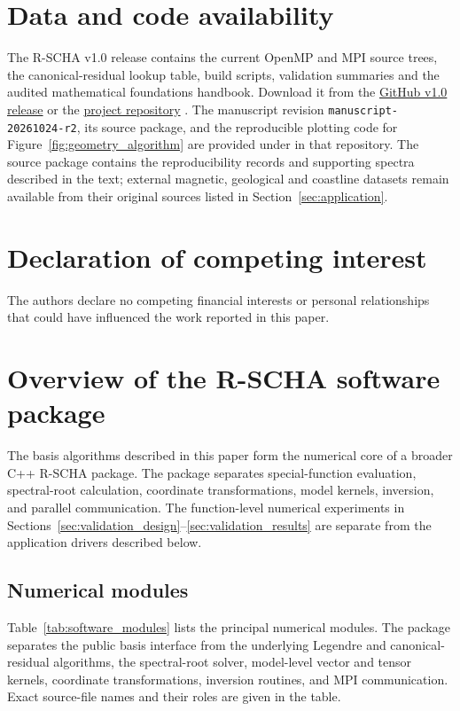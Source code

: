 ﻿\documentclass[11pt,a4paper]{article}
\newcommand{\RSCHA}{\textsc{R-SCHA}\xspace}
\begin{document}
\section*{Data and code availability}
The R-SCHA v1.0 release contains the current OpenMP and MPI source trees, the canonical-residual lookup table, build scripts, validation summaries and the audited mathematical foundations handbook. Download it from the \href{https://github.com/ZhangPan-666/RSCHA-v2.0/releases/tag/v1.0}{GitHub v1.0 release} or the \href{https://github.com/ZhangPan-666/RSCHA-v2.0}{project repository} \citep{RSCHASoftware2026}. The manuscript revision \texttt{manuscript-20261024-r2}, its source package, and the reproducible plotting code for Figure~\ref{fig:geometry_algorithm} are provided under \href{https://github.com/ZhangPan-666/RSCHA-v2.0/tree/main/docs/manuscript}{} in that repository. The source package contains the reproducibility records and supporting spectra described in the text; external magnetic, geological and coastline datasets remain available from their original sources listed in Section~\ref{sec:application}.

\section*{Declaration of competing interest}
The authors declare no competing financial interests or personal relationships that could have influenced the work reported in this paper.

\appendix
{}
\section{Overview of the R-SCHA software package}
\label{app:software}

The basis algorithms described in this paper form the numerical core of a broader C++ \RSCHA package. The package separates special-function evaluation, spectral-root calculation, coordinate transformations, model kernels, inversion, and parallel communication. The function-level numerical experiments in Sections~\ref{sec:validation_design}--\ref{sec:validation_results} are separate from the application drivers described below.

\subsection{Numerical modules}

Table~\ref{tab:software_modules} lists the principal numerical modules. The package separates the public basis interface from the underlying Legendre and canonical-residual algorithms, the spectral-root solver, model-level vector and tensor kernels, coordinate transformations, inversion routines, and MPI communication. Exact source-file names and their roles are given in the table.
\end{document}
